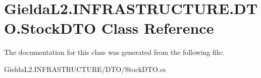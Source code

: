 \hypertarget{class_gielda_l2_1_1_i_n_f_r_a_s_t_r_u_c_t_u_r_e_1_1_d_t_o_1_1_stock_d_t_o}{}\section{Gielda\+L2.\+I\+N\+F\+R\+A\+S\+T\+R\+U\+C\+T\+U\+R\+E.\+D\+T\+O.\+Stock\+D\+TO Class Reference}
\label{class_gielda_l2_1_1_i_n_f_r_a_s_t_r_u_c_t_u_r_e_1_1_d_t_o_1_1_stock_d_t_o}


The documentation for this class was generated from the following file\+:\begin{DoxyCompactItemize}
\item 
Gielda\+L2.\+I\+N\+F\+R\+A\+S\+T\+R\+U\+C\+T\+U\+R\+E/\+D\+T\+O/Stock\+D\+T\+O.\+cs\end{DoxyCompactItemize}
